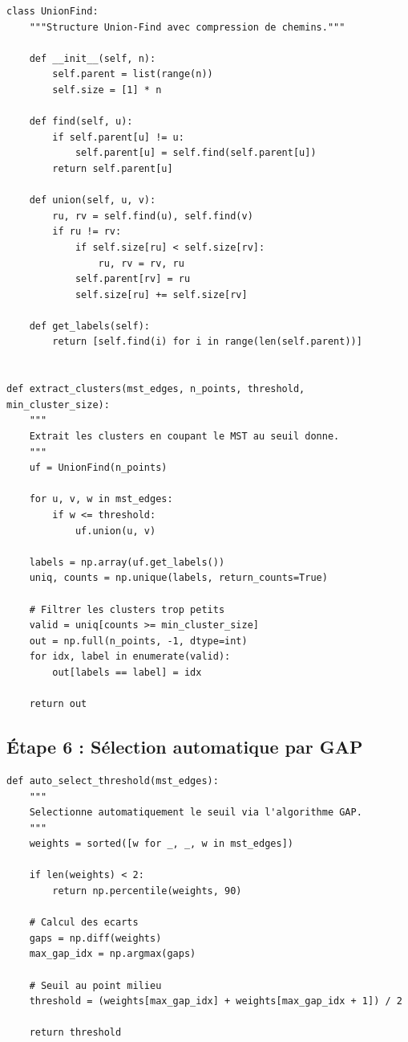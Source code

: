 \documentclass[11pt,a4paper]{article}
\begin{document}
\begin{lstlisting}[caption=Extraction des clusters avec Union-Find]
class UnionFind:
    """Structure Union-Find avec compression de chemins."""
    
    def __init__(self, n):
        self.parent = list(range(n))
        self.size = [1] * n
    
    def find(self, u):
        if self.parent[u] != u:
            self.parent[u] = self.find(self.parent[u])
        return self.parent[u]
    
    def union(self, u, v):
        ru, rv = self.find(u), self.find(v)
        if ru != rv:
            if self.size[ru] < self.size[rv]:
                ru, rv = rv, ru
            self.parent[rv] = ru
            self.size[ru] += self.size[rv]
    
    def get_labels(self):
        return [self.find(i) for i in range(len(self.parent))]


def extract_clusters(mst_edges, n_points, threshold, min_cluster_size):
    """
    Extrait les clusters en coupant le MST au seuil donne.
    """
    uf = UnionFind(n_points)
    
    for u, v, w in mst_edges:
        if w <= threshold:
            uf.union(u, v)
    
    labels = np.array(uf.get_labels())
    uniq, counts = np.unique(labels, return_counts=True)
    
    # Filtrer les clusters trop petits
    valid = uniq[counts >= min_cluster_size]
    out = np.full(n_points, -1, dtype=int)
    for idx, label in enumerate(valid):
        out[labels == label] = idx
    
    return out
\end{lstlisting}

\subsection{Étape 6 : Sélection automatique par GAP}

\begin{lstlisting}[caption=Algorithme GAP pour la selection automatique]
def auto_select_threshold(mst_edges):
    """
    Selectionne automatiquement le seuil via l'algorithme GAP.
    """
    weights = sorted([w for _, _, w in mst_edges])
    
    if len(weights) < 2:
        return np.percentile(weights, 90)
    
    # Calcul des ecarts
    gaps = np.diff(weights)
    max_gap_idx = np.argmax(gaps)
    
    # Seuil au point milieu
    threshold = (weights[max_gap_idx] + weights[max_gap_idx + 1]) / 2
    
    return threshold
\end{lstlisting}
\end{document}
